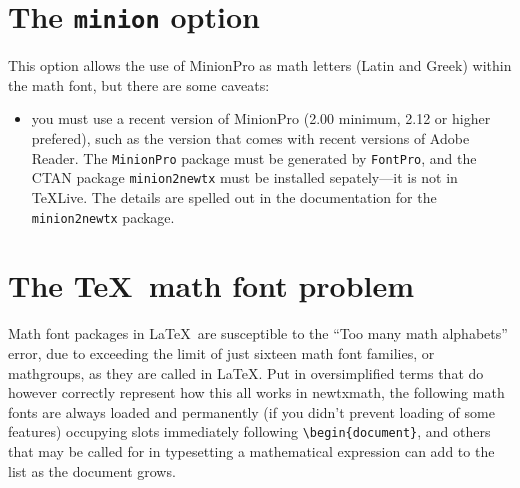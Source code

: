 \documentclass[\fsc]{article}
\theoremstyle{oldplain}
\theoremstyle{plain}
\begin{document}
\section{The {\tt minion} option}
This option allows the use of MinionPro as math letters (Latin and Greek) within  the math font, but there are some caveats:
\begin{itemize}
\item
you must use a recent version of MinionPro (2.00 minimum, 2.12 or higher prefered), such as the version that comes with recent versions of Adobe Reader. The {\tt MinionPro} package must be generated by {\tt FontPro}, and the CTAN package {\tt minion2newtx} must be installed sepately---it is not in \TeX Live. The details are spelled out in the documentation for the {\tt minion2newtx} package.
\end{itemize}

\section{The \TeX\ math font problem}
Math font packages in \LaTeX\ are susceptible to the ``Too many math alphabets'' error, due to exceeding the limit of just sixteen math font families, or mathgroups, as they are called in \LaTeX. Put in oversimplified terms that do however correctly represent how this all works in \textsf{newtxmath}, the following math fonts are always loaded and permanently (if you didn't prevent loading of some features) occupying slots immediately following \verb|\begin{document}|, and others that may be called for in typesetting a mathematical expression can add to the list as the document grows.
\end{document}
